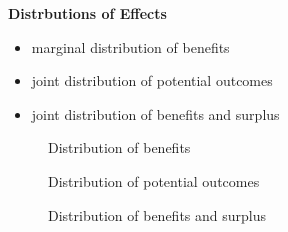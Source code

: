 \begin{frame}\textbf{Distrbutions of Effects}\vspace{0.3cm}
\begin{itemize}\setlength\itemsep{1em}
	\item marginal distribution of benefits
	\item joint distribution of potential outcomes
	\item joint distribution of benefits and surplus
\end{itemize}\end{frame}
\begin{frame}
\begin{figure}[htp]\centering\caption{Distribution of benefits}
\end{figure}
\end{frame}
\begin{frame}
	\begin{figure}\caption{Distribution of potential outcomes}
	\end{figure}
\end{frame}
\begin{frame}
	\begin{figure}\caption{Distribution of benefits and surplus}
	\end{figure}
\end{frame}
